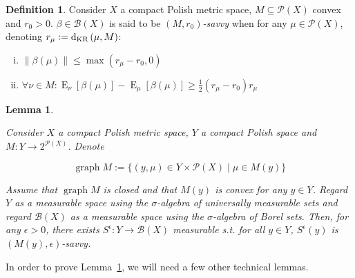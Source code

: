 \documentclass[11pt]{article}
\theoremstyle{definition}
\newtheorem{definition}{Definition}%
\theoremstyle{plain}
\newtheorem{lemma}{Lemma}%
\newcommand{\N}[1]{\lVert #1 \rVert}
\DeclareMathOperator{\E}{E}
\DeclareMathOperator{\Gr}{graph}
\newcommand{\PM}{\mathcal{P}}
\newcommand{\DKR}{\operatorname{d}_{\textnormal{KR}}}
\newcommand{\Gm}{\mathcal{B}}
\begin{document}
\begin{samepage}
\begin{definition}

Consider $X$ a compact Polish metric space, $M \subseteq \PM\left(X\right)$ convex and $r_0 > 0$. $\beta \in \Gm\left(X\right)$ is said to be \emph{$\left(M,r_0\right)$-savvy} when for any $\mu \in \PM\left(X\right)$, denoting $r_\mu:=\DKR\left(\mu,M\right)$:

\begin{enumerate}[i.]

\item $\N{\beta\left(\mu\right)} \leq \max\left(r_\mu - r_0,0\right)$
\item $\forall \nu \in M: \E_\nu[\beta\left(\mu\right)] - \E_\mu[\beta\left(\mu\right)] \geq \frac{1}{2}\left(r_\mu - r_0\right) r_\mu$

\end{enumerate}

\end{definition}
\end{samepage}

\begin{samepage}
\begin{lemma}
\label{lmm:savvy}

Consider $X$ a compact Polish metric space, $Y$ a compact Polish space and $M: Y \rightarrow 2^{\PM\left(X\right)}$. Denote

\begin{equation*}
\Gr{M}:=\{\left(y, \mu\right) \in Y \times \PM\left(X\right) \mid \mu \in M\left(y\right)\}
\end{equation*}

Assume that $\Gr{M}$ is closed and that $M\left(y\right)$ is convex for any $y \in Y$. Regard $Y$ as a measurable space using the $\sigma$-algebra of universally measurable sets and regard $\Gm\left(X\right)$ as a measurable space using the $\sigma$-algebra of Borel sets. Then, for any $\epsilon > 0$, there exists $S^\epsilon: Y \rightarrow \Gm\left(X\right)$ measurable s.t. for all $y \in Y$, $S^\epsilon\left(y\right)$ is $\left(M\left(y\right),\epsilon\right)$-savvy.

\end{lemma}
\end{samepage}

In order to prove Lemma~\ref{lmm:savvy}, we will need a few other technical lemmas.
\end{document}
